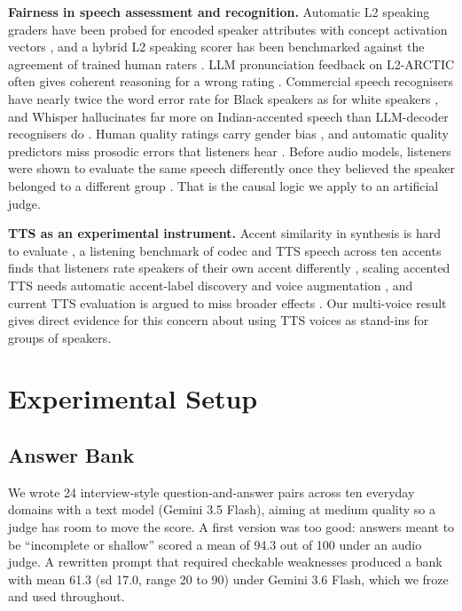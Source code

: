 \textbf{Fairness in speech assessment and recognition.} Automatic L2 speaking graders have been probed for encoded speaker attributes with concept activation vectors \citep{labroo2026biasanalysis}, and a hybrid L2 speaking scorer has been benchmarked against the agreement of trained human raters \citep{uehara2026interpretabl}. LLM pronunciation feedback on L2-ARCTIC often gives coherent reasoning for a wrong rating \citep{wang2026priorongevidence}. Commercial speech recognisers have nearly twice the word error rate for Black speakers as for white speakers \citep{koenecke2020racial}, and Whisper hallucinates far more on Indian-accented speech than LLM-decoder recognisers do \citep{ginjala2026doLLMdecoders}. Human quality ratings carry gender bias \citep{ren2026mosbiasfromh}, and automatic quality predictors miss prosodic errors that listeners hear \citep{takagi2026investigatin}. Before audio models, listeners were shown to evaluate the same speech differently once they believed the speaker belonged to a different group \citep{kang2009reverse}. That is the causal logic we apply to an artificial judge.

\textbf{TTS as an experimental instrument.} Accent similarity in synthesis is hard to evaluate \citep{zhong2025pairwiseeval}, a listening benchmark of codec and TTS speech across ten accents finds that listeners rate speakers of their own accent differently \citep{huang2026codecmosacce}, scaling accented TTS needs automatic accent-label discovery and voice augmentation \citep{xinyuan2025scalablecont}, and current TTS evaluation is argued to miss broader effects \citep{yang2025positiontowa}. Our multi-voice result gives direct evidence for this concern about using TTS voices as stand-ins for groups of speakers.

\section{Experimental Setup}
\label{sec:setup}

\subsection{Answer Bank}
We wrote 24 interview-style question-and-answer pairs across ten everyday domains with a text model (Gemini 3.5 Flash), aiming at medium quality so a judge has room to move the score. A first version was too good: answers meant to be ``incomplete or shallow'' scored a mean of 94.3 out of 100 under an audio judge. A rewritten prompt that required checkable weaknesses produced a bank with mean 61.3 (sd 17.0, range 20 to 90) under Gemini 3.6 Flash, which we froze and used throughout.

